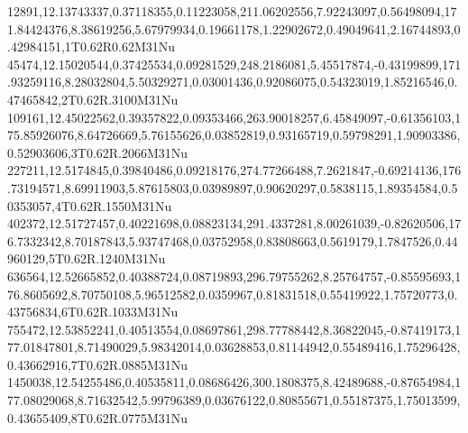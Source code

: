 12891,12.13743337,0.37118355,0.11223058,211.06202556,7.92243097,0.56498094,171.84424376,8.38619256,5.67979934,0.19661178,1.22902672,0.49049641,2.16744893,0.42984151,1T0.62R0.62M31Nu
45474,12.15020544,0.37425534,0.09281529,248.2186081,5.45517874,-0.43199899,171.93259116,8.28032804,5.50329271,0.03001436,0.92086075,0.54323019,1.85216546,0.47465842,2T0.62R.3100M31Nu
109161,12.45022562,0.39357822,0.09353466,263.90018257,6.45849097,-0.61356103,175.85926076,8.64726669,5.76155626,0.03852819,0.93165719,0.59798291,1.90903386,0.52903606,3T0.62R.2066M31Nu
227211,12.5174845,0.39840486,0.09218176,274.77266488,7.2621847,-0.69214136,176.73194571,8.69911903,5.87615803,0.03989897,0.90620297,0.5838115,1.89354584,0.50353057,4T0.62R.1550M31Nu
402372,12.51727457,0.40221698,0.08823134,291.4337281,8.00261039,-0.82620506,176.7332342,8.70187843,5.93747468,0.03752958,0.83808663,0.5619179,1.7847526,0.44960129,5T0.62R.1240M31Nu
636564,12.52665852,0.40388724,0.08719893,296.79755262,8.25764757,-0.85595693,176.8605692,8.70750108,5.96512582,0.0359967,0.81831518,0.55419922,1.75720773,0.43756834,6T0.62R.1033M31Nu
755472,12.53852241,0.40513554,0.08697861,298.77788442,8.36822045,-0.87419173,177.01847801,8.71490029,5.98342014,0.03628853,0.81144942,0.55489416,1.75296428,0.43662916,7T0.62R.0885M31Nu
1450038,12.54255486,0.40535811,0.08686426,300.1808375,8.42489688,-0.87654984,177.08029068,8.71632542,5.99796389,0.03676122,0.80855671,0.55187375,1.75013599,0.43655409,8T0.62R.0775M31Nu
